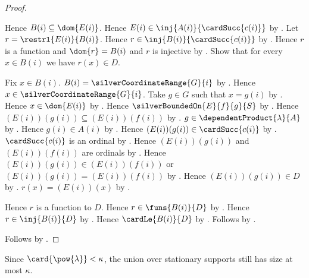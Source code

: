 \begin{proof}
\begin{subproof}
\begin{subproof}
        \end{subproof}
        Hence $B(i)\subseteq\dom{E(i)}$.
        Hence $E(i)\in\inj{A(i)}{\cardSucc{c(i)}}$ by
            .
        Let $r=\restrl{E(i)}{B(i)}$.
        Hence $r\in\inj{B(i)}{\cardSucc{c(i)}}$
            by .
        Hence $r$ is a function and $\dom{r}=B(i)$ and
            $r$ is injective
            by .
        Show that for every $x\in B(i)$ we have $r(x)\in D$.
        \begin{subproof}
            Fix $x\in B(i)$.
            $B(i)=\silverCoordinateRange{G}{i}$
                by .
            Hence $x\in\silverCoordinateRange{G}{i}$.
            Take $g\in G$ such that $x=g(i)$
                by .
            Hence $x\in\dom{E(i)}$ by .
            Hence $\silverBoundedOn{E}{f}{g}{S}$
                by .
            Hence $(E(i))(g(i))\subseteq(E(i))(f(i))$
                by .
            $g\in\dependentProduct{\lambda}{A}$ by .
            Hence $g(i)\in A(i)$
                by .
            Hence $(E(i))(g(i))\in\cardSucc{c(i)}$
                by .
            $\cardSucc{c(i)}$ is an ordinal
                by .
            Hence $(E(i))(g(i))$ and $(E(i))(f(i))$ are ordinals
                by .
            Hence $(E(i))(g(i))\in(E(i))(f(i))$ or
                $(E(i))(g(i))=(E(i))(f(i))$
                by .
            Hence $(E(i))(g(i))\in D$ by .
            $r(x)=(E(i))(x)$ by .
        \end{subproof}
        Hence $r$ is a function to $D$.
        Hence $r\in\funs{B(i)}{D}$ by .
        Hence $r\in\inj{B(i)}{D}$ by .
        Hence $\cardLe{B(i)}{D}$ by .
        Follows by .
    \end{subproof}
    Follows by .
\end{proof}

Since $\card{\pow{\lambda}}<\kappa$, the union over stationary supports
still has size at most $\kappa$.

